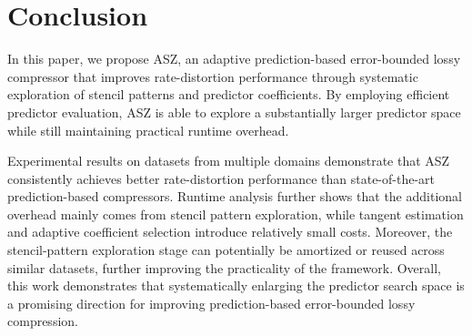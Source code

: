 


\section{Conclusion}\label{sec:conclusion}

In this paper, we propose ASZ, an adaptive prediction-based error-bounded lossy compressor that improves rate-distortion performance through systematic exploration of stencil patterns and predictor coefficients. By employing efficient predictor evaluation, ASZ is able to explore a substantially larger predictor space while still maintaining practical runtime overhead.

Experimental results on datasets from multiple domains demonstrate that ASZ consistently achieves better rate-distortion performance than state-of-the-art prediction-based compressors. Runtime analysis further shows that the additional overhead mainly comes from stencil pattern exploration, while tangent estimation and adaptive coefficient selection introduce relatively small costs. Moreover, the stencil-pattern exploration stage can potentially be amortized or reused across similar datasets, further improving the practicality of the framework. Overall, this work demonstrates that systematically enlarging the predictor search space is a promising direction for improving prediction-based error-bounded lossy compression.

